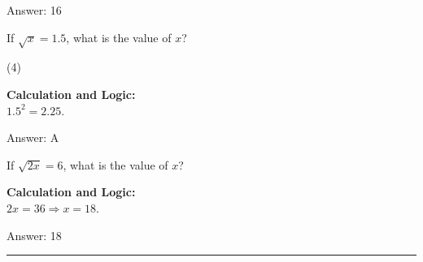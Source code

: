 \documentclass[11pt,paper=a4,answers]{exam}
\begin{document}
\begin{questions}
\begin{solution}
Answer: \colorbox{yellow!100}{16}
\end{solution}

\vspace{40pt}

\question
If $\sqrt{x} = 1.5$, what is the value of $x$?
\begin{tasks}(4)
\end{tasks}

\begin{solution}
\textbf{Calculation and Logic:} \\
$1.5^2 = 2.25$.

\vspace{25pt}

Answer: \colorbox{yellow!100}{A}
\end{solution}

\vspace{40pt}

\question
If $\sqrt{2x} = 6$, what is the value of $x$?

\begin{solution}
\textbf{Calculation and Logic:} \\
$2x = 36 \Rightarrow x = 18$.

\vspace{25pt}

Answer: \colorbox{yellow!100}{18}
\end{solution}


\end{questions}
\begin{center}
\rule{.5\textwidth}{1pt}
\end{center}
\end{document}
